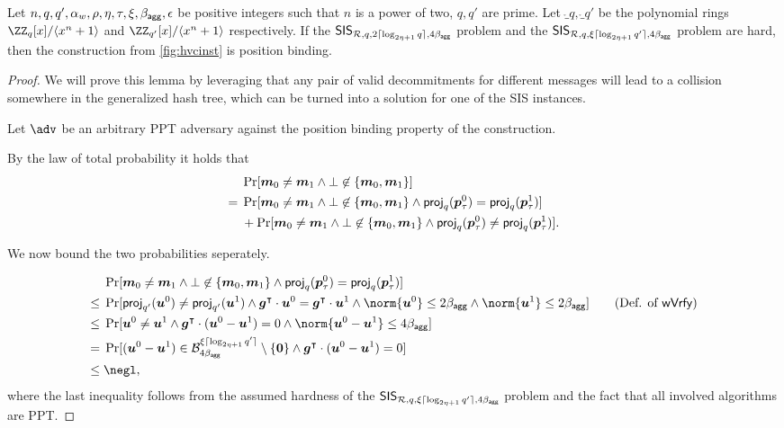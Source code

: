 \begin{lemma}\label{lem:hvcposbind}
  Let $n,q,q',\alpha_w,\rho,\eta,\tau,\xi,\beta_{\mathsf{agg}},\epsilon$ be positive integers such that $n$ is a power of two, $q,q'$ are prime.
  Let $\ring_q,\ring_{q'}$ be the polynomial rings $\ZZ_q[x]/\langle x^n+1\rangle$ and $\ZZ_{q'}[x]/\langle x^n+1\rangle$ respectively.
  If the $\mathsf{SIS}_{\mathcal{R},q,2\lceil \log_{2\eta+1} q \rceil,4\beta_{\mathsf{agg}}}$ problem and the $\mathsf{SIS}_{\mathcal{R},q,\xi\lceil \log_{2\eta+1} q' \rceil,4\beta_{\mathsf{agg}}}$ problem are hard, then the construction from \autoref{fig:hvcinst} is position binding.
\end{lemma}
\begin{proof}
We will prove this lemma by leveraging that any pair of valid decommitments for different messages will lead to a collision somewhere in the generalized hash tree, which can be turned into a solution for one of the SIS instances. 

  Let $\adv$ be an arbitrary PPT adversary against the position binding property of the construction.
  
  By the law of total probability it holds that
  \begin{align*}
    &\Pr[\boldsymbol{m}_0\neq \boldsymbol{m}_1 \land \bot\not\in\{\boldsymbol{m}_0,\boldsymbol{m}_1\}]\\
    ={}& \Pr[\boldsymbol{m}_0\neq \boldsymbol{m}_1 \land \bot\not\in\{\boldsymbol{m}_0,\boldsymbol{m}_1\} \land \mathsf{proj}_q(\boldsymbol{p}_\tau^0) = \mathsf{proj}_q(\boldsymbol{p}_\tau^1)]\\& + \Pr[\boldsymbol{m}_0\neq \boldsymbol{m}_1 \land \bot\not\in\{\boldsymbol{m}_0,\boldsymbol{m}_1\} \land \mathsf{proj}_q(\boldsymbol{p}_\tau^0) \neq \mathsf{proj}_q(\boldsymbol{p}_\tau^1)].
  \end{align*}
  
  We now bound the two probabilities seperately.
  
  \begin{align*}
    &\Pr[\vec{m}_0\neq \vec{m}_1 \land \bot\not\in\{\vec{m}_0,\vec{m}_1\} \land \proj_q(\vec{p}_\tau^0) = \proj_q(\vec{p}_\tau^1)]\\
    \leq{}&\Pr[\proj_{q'}(\vec{u}^0) \neq \proj_{q'}(\vec{u}^1) \land \vec{g}^\intercal\cdot \vec{u}^0 = \vec{g}^\intercal\cdot \vec{u}^1 \land \norm{\vec{u}^0}\leq 2\bagg \land \norm{\vec{u}^1}\leq 2\bagg]\tag{Def. of $\wverify$}\\
    \leq{}& \Pr[\vec{u}^0 \neq \vec{u}^1 \land \vec{g}^\intercal\cdot (\vec{u}^0-\vec{u}^1) = 0 \land \norm{\vec{u}^0-\vec{u}^1}\leq 4\bagg]\\
    = {}& \Pr[(\vec{u}^0-\vec{u}^1) \in \ball_{4\bagg}^{\xi\lceil\log_{2\eta+1}q'\rceil}\setminus \{\vec{0}\} \land \vec{g}^\intercal\cdot (\vec{u}^0-\vec{u}^1) = 0]\\
    \leq{}& \negl,
  \end{align*}
  where the last inequality follows from the assumed hardness of the $\mathsf{SIS}_{\mathcal{R},q,\xi\lceil \log_{2\eta+1} q' \rceil,4\beta_{\mathsf{agg}}}$ problem and the fact that all involved algorithms are PPT.
  

\end{proof}

